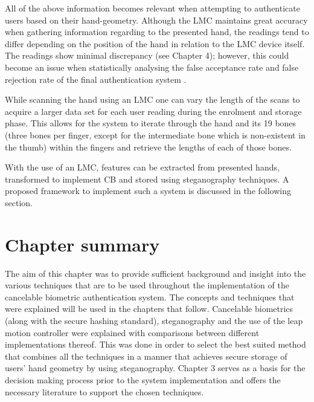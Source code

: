 All of the above information becomes relevant when attempting to authenticate users based on their hand-geometry. Although the LMC maintains great accuracy when gathering information regarding to the presented hand, the readings tend to differ depending on the position of the hand in relation to the LMC device itself. The readings show minimal discrepancy (see Chapter 4); however, this could become an issue when statistically analysing the false acceptance rate and false rejection rate of the final authentication system \cite{Nagar2009}.

While scanning the hand using an LMC one can vary the length of the scans to acquire a larger data set for each user reading during the enrolment and storage phase. This allows for the system to iterate through the hand and its 19 bones (three bones per finger, except for the intermediate bone which is non-existent in the thumb) within the fingers and retrieve the lengths of each of those bones.

With the use of an LMC, features can be extracted from presented hands, transformed to implement CB and stored using steganography techniques. A proposed framework to implement such a system is discussed in the following section.


\section[Chapter summary]{Chapter summary}

The aim of this chapter was to provide sufficient background and insight into the various techniques that are to be used throughout the implementation of the cancelable biometric authentication system. The concepts and techniques that were explained will be used in the chapters that follow. Cancelable biometrics (along with the secure hashing standard), steganography and the use of the leap motion controller were explained with comparisons between different implementations thereof. This was done in order to select the best suited method that combines all the techniques in a manner that achieves secure storage of users’ hand geometry by using steganography.
Chapter 3 serves as a basis for the decision making process prior to the system implementation and offers the necessary literature to support the chosen techniques.


